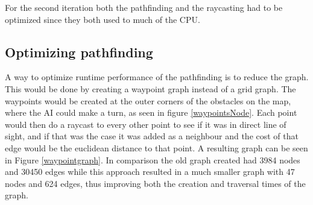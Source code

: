 For the second iteration both the pathfinding and the raycasting had to be optimized since they both used to much of the CPU.

\subsection*{Optimizing pathfinding}
A way to optimize runtime performance of the pathfinding is to reduce the graph.
This would be done by creating a waypoint graph instead of a grid graph.
The waypoints would be created at the outer corners of the obstacles on the map, where the AI could make a turn, as seen in figure \ref{waypointsNode}.
Each point would then do a raycast to every other point to see if it was in direct line of sight, and if that was the case it was added as a neighbour and the cost of that edge would be the euclidean distance to that point.
A resulting graph can be seen in Figure \ref{waypointgraph}.
In comparison the old graph created had 3984 nodes and 30450 edges while this approach resulted in a much smaller graph with 47 nodes and 624 edges, thus improving both the creation and traversal times of the graph.

